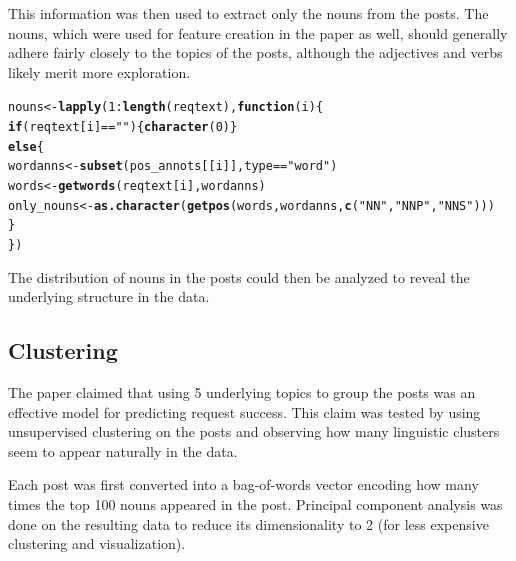 \documentclass{article}\usepackage[]{graphicx}\usepackage[]{color}
\makeatletter
\newcommand{\hlnum}[1]{\textcolor[rgb]{0.686,0.059,0.569}{#1}}%
\newcommand{\hlstr}[1]{\textcolor[rgb]{0.192,0.494,0.8}{#1}}%
\newcommand{\hlopt}[1]{\textcolor[rgb]{0,0,0}{#1}}%
\newcommand{\hlstd}[1]{\textcolor[rgb]{0.345,0.345,0.345}{#1}}%
\newcommand{\hlkwa}[1]{\textcolor[rgb]{0.161,0.373,0.58}{\textbf{#1}}}%
\newcommand{\hlkwb}[1]{\textcolor[rgb]{0.69,0.353,0.396}{#1}}%
\newcommand{\hlkwc}[1]{\textcolor[rgb]{0.333,0.667,0.333}{#1}}%
\newcommand{\hlkwd}[1]{\textcolor[rgb]{0.737,0.353,0.396}{\textbf{#1}}}%
\newenvironment{kframe}{%
 \def\at@end@of@kframe{}%
 \ifinner\ifhmode%
  \def\at@end@of@kframe{\end{minipage}}%
  \begin{minipage}{\columnwidth}%
 \fi\fi%
 \def\FrameCommand##1{\hskip\@totalleftmargin \hskip-\fboxsep
 \colorbox{shadecolor}{##1}\hskip-\fboxsep
     \hskip-\linewidth \hskip-\@totalleftmargin \hskip\columnwidth}%
 \MakeFramed {\advance\hsize-\width
   \@totalleftmargin\z@ \linewidth\hsize
   \@setminipage}}%
 {\par\unskip\endMakeFramed%
 \at@end@of@kframe}
\newenvironment{knitrout}{}{} %
\makeatother
\begin{document}
This information was then used to extract only the nouns from the posts. The nouns, which were used for feature creation in the paper as well, should generally adhere fairly closely to the topics of the posts, although the adjectives and verbs likely merit more exploration.

\begin{knitrout}
\color{fgcolor}\begin{kframe}
\begin{alltt}
\hlstd{nouns} \hlkwb{<-} \hlkwd{lapply}\hlstd{(}\hlnum{1}\hlopt{:}\hlkwd{length}\hlstd{(reqtext),} \hlkwa{function}\hlstd{(}\hlkwc{i}\hlstd{)\{}
  \hlkwa{if} \hlstd{(reqtext[i]} \hlopt{==} \hlstr{""}\hlstd{) \{}\hlkwd{character}\hlstd{(}\hlnum{0}\hlstd{)\}}
  \hlkwa{else} \hlstd{\{}
    \hlstd{wordanns} \hlkwb{<-} \hlkwd{subset}\hlstd{(pos_annots[[i]], type}\hlopt{==}\hlstr{"word"}\hlstd{)}
    \hlstd{words} \hlkwb{<-} \hlkwd{getwords}\hlstd{(reqtext[i], wordanns)}
    \hlstd{only_nouns} \hlkwb{<-} \hlkwd{as.character}\hlstd{(}\hlkwd{getpos}\hlstd{(words, wordanns,} \hlkwd{c}\hlstd{(}\hlstr{"NN"}\hlstd{,}\hlstr{"NNP"}\hlstd{,}\hlstr{"NNS"}\hlstd{)))}
  \hlstd{\}}
\hlstd{\})}
\end{alltt}
\end{kframe}
\end{knitrout}

The distribution of nouns in the posts could then be analyzed to reveal the underlying structure in the data.

\subsection{Clustering}

The paper claimed that using 5 underlying topics to group the posts was an effective model for predicting request success. This claim was tested by using unsupervised clustering on the posts and observing how many linguistic clusters seem to appear naturally in the data.

Each post was first converted into a bag-of-words vector encoding how many times the top 100 nouns appeared in the post. Principal component analysis was done on the resulting data to reduce its dimensionality to 2 (for less expensive clustering and visualization).
\end{document}
